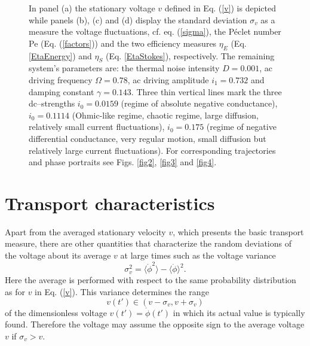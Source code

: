 \documentclass{physeauth}
\def\be{\begin{equation}}
\def\ee#1{\label{#1}\end{equation}}
\def\la{\langle}
\def\ra{\rangle}
\begin{document}
\begin{figure}
{In panel (a) the stationary voltage $v$ defined in Eq. (\ref{v}) is
depicted while panels (b), (c) and (d) display the standard deviation
$\sigma_v$ as a measure the voltage fluctuations, cf. eq. (\ref{sigma}),
the P\'eclet number  Pe  (Eq. (\ref{factors})) 
and the two efficiency measures
$\eta_{E}$ (Eq. \ref{EtaEnergy}) and $\eta_{S}$  (Eq. \ref{EtaStokes}), respectively. 
The remaining system's  parameters are: the thermal noise intensity $D=0.001$, ac driving
  frequency $\Omega=0.78$, ac driving amplitude $i_1=0.732$ and
  damping constant $\gamma=0.143$.  Three thin vertical lines 
  mark the three dc--strengths 
  $i_0=0.0159$ (regime of absolute negative conductance), $i_0=0.1114$
  (Ohmic-like regime, chaotic regime, large diffusion, relatively
  small current fluctuations), $i_0=0.175$ (regime of negative
  differential conductance, very regular motion, small diffusion but
  relatively large current fluctuations). For corresponding trajectories
  and phase portraits see Figs. \ref{fig2}, \ref{fig3} and
  \ref{fig4}.  }
\label{fig1}
\end{figure}

\section{Transport characteristics} 

Apart from the averaged stationary velocity $v$, which presents the basic 
transport measure, there are other quantities that characterize the random
deviations of the voltage about its average $v$ at large times such as
the voltage variance 
\be
\sigma_v^2 = \la \dot\phi^2 \ra -\la \dot\phi \ra^2.
\ee{sigma}
Here
the average is performed with respect to the same probability
distribution as for $v$ in Eq. (\ref{v}).
This variance determines the range  
%
\be
v(t') \in \left( v  -\sigma_v,  v+\sigma_v\right)
\ee{v(t)}
% 
of the 
dimensionless voltage $v(t')=\dot{\phi}(t')$  in which its actual value is
typically found.
Therefore the voltage may assume the opposite
sign to  the average voltage $v$ if $\sigma_v > v $.
\end{document}

